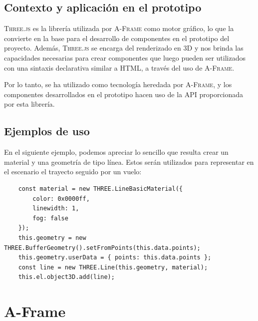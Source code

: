 \documentclass[a4paper, 11pt]{book}
\begin{document}
\subsection{Contexto y aplicación en el prototipo}
\textsc{Three.js} es la librería utilizada por \textsc{A-Frame} como motor gráfico, lo que la convierte en la base para el desarrollo de componentes en el prototipo del proyecto. Además, \textsc{Three.js} se encarga del renderizado en \textsc{3D} y nos brinda las capacidades necesarias para crear componentes que luego pueden ser utilizados con una sintaxis declarativa similar a \textsc{HTML}, a través del uso de \textsc{A-Frame}. 

Por lo tanto, se ha utilizado como tecnología heredada por \textsc{A-Frame}, y los componentes desarrollados en el prototipo hacen uso de la \textsc{API} proporcionada por esta librería.
\subsection{Ejemplos de uso}
En el siguiente ejemplo, podemos apreciar lo sencillo que resulta crear un material y una geometría de tipo línea. Estos serán utilizados para representar en el escenario el trayecto seguido por un vuelo:
\begin{verbatim}
	const material = new THREE.LineBasicMaterial({
		color: 0x0000ff,
		linewidth: 1,
		fog: false
	});
	this.geometry = new THREE.BufferGeometry().setFromPoints(this.data.points);
	this.geometry.userData = { points: this.data.points };
	const line = new THREE.Line(this.geometry, material);
	this.el.object3D.add(line);
\end{verbatim}
\section{A-Frame}
\label{sec:aframe}
\end{document}
